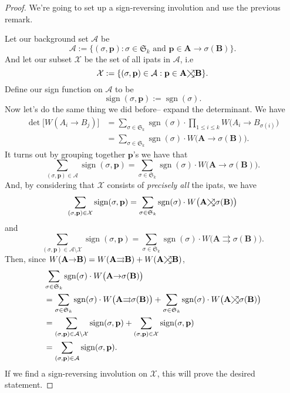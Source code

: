 \documentclass{article}
\newcommand\toea{\mathrel{\ooalign{$\nearrow$\cr$\searrow$\cr}}}
\newcommand\toto{\rightrightarrows}
\DeclareMathOperator{\sign}{sign}
\DeclareMathOperator{\sgn}{sgn}
\begin{document}
\begin{proof}
    We're going to set up a sign-reversing involution and use the previous remark.

    Let our background set $\mathcal{A}$ be
    \[
        \mathcal{A} := \{ (\sigma, \mathbf{p}) : \sigma \in \mathfrak{S}_k \text{ and } \mathbf{p} \in \mathbf{A}{\to}\sigma(\mathbf{B})\}.
    \]
    And let our subset $\mathcal{X}$ be the set of all ipats in $\mathcal{A}$, i.e
    \[
        \mathcal{X} := \{(\sigma, \mathbf{p}) \in \mathcal{A} : \mathbf{p} \in \mathbf{A}{\toea}{\mathbf{B}}\}.
    \]
    Define our sign function on $\mathcal{A}$ to be
    \[
        \sign (\sigma, \mathbf{p}) := \sgn (\sigma).
    \]
    Now let's do the same thing we did before-- expand the determinant. We have
    \begin{align*}
        \det \Big[W(A_i{\to}B_j)\Big] &= \sum_{\sigma \in \mathfrak{S}_k}\sgn(\sigma) \cdot \prod_{1 \leq i \leq k} W\big(A_i{\to}B_{\sigma(i)}\big) \\
                                       &= \sum_{\sigma \in \mathfrak{S}_k}\sgn(\sigma) \cdot W\big(\mathbf{A}{\to}\sigma(\mathbf{B})\big).
    \end{align*}
    It turns out by grouping together $\mathbf{p}$'s we have that
    \[
        \sum_{(\sigma,\mathbf{p})\in\mathcal{A}} \sign (\sigma,\mathbf{p}) = \sum_{\sigma \in \mathfrak{S}_k}\sgn(\sigma) \cdot W\big(\mathbf{A}{\to}\sigma(\mathbf{B})\big). 
    \]
    And, by considering that $\mathcal{X}$ consists of \textit{precisely all} the ipats, we have
    \[
        \sum_{(\sigma,\mathbf{p})\in\mathcal{X}} \sign (\sigma,\mathbf{p}) = \sum_{\sigma \in \mathfrak{S}_k}\sgn(\sigma) \cdot W\big(\mathbf{A}{\toea}\sigma(\mathbf{B})\big)
    \]
    and
    \[
        \sum_{(\sigma,\mathbf{p})\in\mathcal{A}\setminus\mathcal{X}} \sign (\sigma,\mathbf{p}) = \sum_{\sigma \in \mathfrak{S}_k}\sgn(\sigma) \cdot W\big(\mathbf{A}{\toto}\sigma(\mathbf{B})\big). 
    \]
    Then, since $W(\mathbf{A}{\to}\mathbf{B}) = W(\mathbf{A}{\toto}\mathbf{B}) + W(\mathbf{A}{\toea}\mathbf{B})$,
    \begin{align*}
        &\sum_{\sigma \in \mathfrak{S}_k}\sgn(\sigma) \cdot W\big(\mathbf{A}{\to}\sigma(\mathbf{B})\big) \\
        &= \sum_{\sigma \in \mathfrak{S}_k}\sgn(\sigma) \cdot W\big(\mathbf{A}{\toto}\sigma(\mathbf{B})\big) + \sum_{\sigma \in \mathfrak{S}_k}\sgn(\sigma) \cdot W\big(\mathbf{A}{\toea}\sigma(\mathbf{B})\big) \\
        &= \sum_{(\sigma,\mathbf{p})\in\mathcal{A}\setminus\mathcal{X}} \sign (\sigma,\mathbf{p}) + \sum_{(\sigma,\mathbf{p})\in\mathcal{X}} \sign (\sigma,\mathbf{p}) \\
        &= \sum_{(\sigma,\mathbf{p})\in\mathcal{A}} \sign (\sigma,\mathbf{p}).
    \end{align*}
    If we find a sign-reversing involution on $\mathcal{X}$, this will prove the desired statement.


\end{proof}
\end{document}
